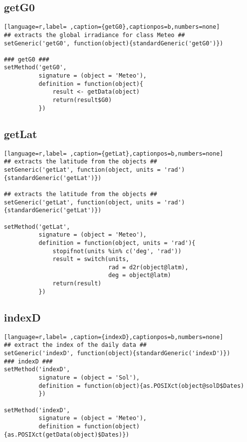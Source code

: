 \subsection{getG0}
\label{sec:orga5dd061}
\label{subsec:getg0}
\begin{lstlisting}[language=r,label= ,caption={getG0},captionpos=b,numbers=none]
## extracts the global irradiance for class Meteo ##
setGeneric('getG0', function(object){standardGeneric('getG0')})

### getG0 ###
setMethod('getG0',
          signature = (object = 'Meteo'),
          definition = function(object){
              result <- getData(object)
              return(result$G0)
          })
\end{lstlisting}
\subsection{getLat}
\label{sec:orgc96f2f8}
\label{subsec:getlat}
\begin{lstlisting}[language=r,label= ,caption={getLat},captionpos=b,numbers=none]
## extracts the latitude from the objects ##
setGeneric('getLat', function(object, units = 'rad')
{standardGeneric('getLat')})

## extracts the latitude from the objects ##
setGeneric('getLat', function(object, units = 'rad')
{standardGeneric('getLat')})

setMethod('getLat',
          signature = (object = 'Meteo'),
          definition = function(object, units = 'rad'){
              stopifnot(units %in% c('deg', 'rad'))
              result = switch(units,
                              rad = d2r(object@latm),
                              deg = object@latm)
              return(result)
          })
\end{lstlisting}
\subsection{indexD}
\label{sec:org9728db0}
\label{subsec:indexd}
\begin{lstlisting}[language=r,label= ,caption={indexD},captionpos=b,numbers=none]
## extract the index of the daily data ##
setGeneric('indexD', function(object){standardGeneric('indexD')})
### indexD ###
setMethod('indexD',
          signature = (object = 'Sol'),
          definition = function(object){as.POSIXct(object@solD$Dates)
          })

setMethod('indexD',
          signature = (object = 'Meteo'),
          definition = function(object){as.POSIXct(getData(object)$Dates)})
\end{lstlisting}
